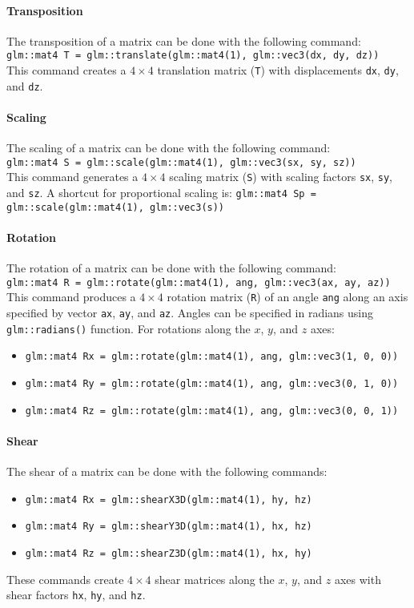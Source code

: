 \paragraph*{Transposition}
The transposition of a matrix can be done with the following command: 
\texttt{glm::mat4 T = glm::translate(glm::mat4(1), glm::vec3(dx, dy, dz))} \\
This command creates a $4 \times 4$ translation matrix (\texttt{T}) with displacements \texttt{dx}, \texttt{dy}, and \texttt{dz}.

\paragraph*{Scaling}
The scaling of a matrix can be done with the following command: \\
\texttt{glm::mat4 S = glm::scale(glm::mat4(1), glm::vec3(sx, sy, sz))} \\
This command generates a $4 \times 4$ scaling matrix (\texttt{S}) with scaling factors \texttt{sx}, \texttt{sy}, and \texttt{sz}. 
A shortcut for proportional scaling is:
\texttt{glm::mat4 Sp = glm::scale(glm::mat4(1), glm::vec3(s))}

\paragraph*{Rotation}
The rotation of a matrix can be done with the following command: \\
\texttt{glm::mat4 R = glm::rotate(glm::mat4(1), ang, glm::vec3(ax, ay, az))} \\
This command produces a $4 \times 4$ rotation matrix (\texttt{R}) of an angle \texttt{ang} along an axis specified by vector \texttt{ax}, \texttt{ay}, and \texttt{az}. 
Angles can be specified in radians using \texttt{glm::radians()} function. 
For rotations along the $x$, $y$, and $z$ axes:
\begin{itemize}
    \item \texttt{glm::mat4 Rx = glm::rotate(glm::mat4(1), ang, glm::vec3(1, 0, 0))}
    \item \texttt{glm::mat4 Ry = glm::rotate(glm::mat4(1), ang, glm::vec3(0, 1, 0))}
    \item \texttt{glm::mat4 Rz = glm::rotate(glm::mat4(1), ang, glm::vec3(0, 0, 1))}
\end{itemize}

\paragraph*{Shear}
The shear of a matrix can be done with the following commands:
\begin{itemize}
    \item \texttt{glm::mat4 Rx = glm::shearX3D(glm::mat4(1), hy, hz)}
    \item \texttt{glm::mat4 Ry = glm::shearY3D(glm::mat4(1), hx, hz)}
    \item \texttt{glm::mat4 Rz = glm::shearZ3D(glm::mat4(1), hx, hy)}
\end{itemize}
These commands create $4 \times 4$ shear matrices along the $x$, $y$, and $z$ axes with shear factors \texttt{hx}, \texttt{hy}, and \texttt{hz}.